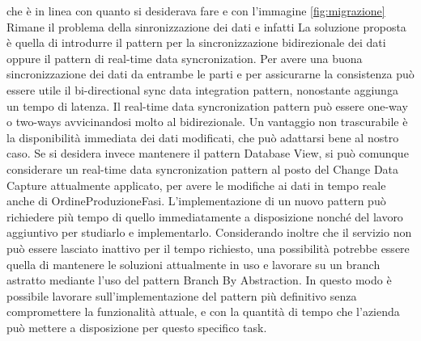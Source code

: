         che è in linea con quanto si desiderava fare e con l'immagine \ref{fig:migrazione}
        Rimane il problema della sinronizzazione dei dati e infatti La soluzione proposta è quella di introdurre il pattern per la sincronizzazione bidirezionale dei dati oppure il pattern di real-time data syncronization. Per avere una buona sincronizzazione dei dati da entrambe le parti e per assicurarne la consistenza può essere utile il bi-directional sync data integration pattern, nonostante aggiunga un tempo di latenza. Il real-time data syncronization pattern può essere one-way o two-ways avvicinandosi molto al bidirezionale. Un vantaggio non trascurabile è la disponibilità immediata dei dati modificati, che può adattarsi bene al nostro caso.
        Se si desidera invece mantenere il pattern Database View, si può comunque considerare un real-time data syncronization pattern al posto del Change Data Capture attualmente applicato, per avere le modifiche ai dati in tempo reale anche di OrdineProduzioneFasi. L'implementazione di un nuovo pattern può richiedere più tempo di quello immediatamente a disposizione nonché del lavoro aggiuntivo per studiarlo e implementarlo. Considerando inoltre che il servizio non può essere lasciato inattivo per il tempo richiesto, una possibilità potrebbe essere quella di mantenere le soluzioni attualmente in uso e lavorare su un branch astratto mediante l'uso del pattern Branch By Abstraction. In questo modo è possibile lavorare sull'implementazione del pattern più definitivo senza compromettere la funzionalità attuale, e con la quantità di tempo che l'azienda può mettere a disposizione per questo specifico task.
